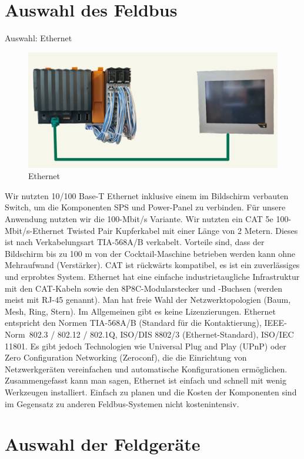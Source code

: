 \documentclass[10pt,a4paper]{report}
\begin{document}
	\section{Auswahl des Feldbus}
	Auswahl: Ethernet\\
	\begin{figure}[htb]
		\includegraphics[width=1\textwidth]{Ethernet}
		\centering
		\caption{Ethernet}
	\end{figure}
	Wir nutzten 10/100 Base-T Ethernet inklusive einem im Bildschirm verbauten Switch, um die Komponenten SPS und Power-Panel zu verbinden. Für unsere Anwendung nutzten wir die 100-Mbit/s Variante. 
	Wir nutzten ein CAT 5e 100-Mbit/s-Ethernet Twisted Pair Kupferkabel mit einer Länge von 2 Metern. Dieses ist nach Verkabelungsart TIA-568A/B verkabelt. 
	Vorteile sind, dass der Bildschirm bis zu 100 m von der Cocktail-Maschine betrieben werden kann ohne Mehraufwand (Verstärker). CAT ist rückwärts kompatibel, es ist ein zuverlässiges und erprobtes System. 
	Ethernet hat eine einfache industrietaugliche Infrastruktur mit den CAT-Kabeln sowie den 8P8C-Modularstecker und -Buchsen (werden meist mit RJ-45 genannt). Man hat freie Wahl der Netzwerktopologien (Baum, Mesh, Ring, Stern).
	Im Allgemeinen gibt es keine Lizenzierungen.
	Ethernet entspricht den Normen TIA-568A/B (Standard für die Kontaktierung), IEEE-Norm 802.3 / 802.12 / 802.1Q, ISO/DIS 8802/3 (Ethernet-Standard), ISO/IEC 11801.
	Es gibt jedoch Technologien wie Universal Plug and Play (UPnP) oder Zero Configuration Networking (Zeroconf), die die Einrichtung von Netzwerkgeräten vereinfachen und automatische Konfigurationen ermöglichen. 
	Zusammengefasst kann man sagen, Ethernet ist einfach und schnell mit wenig Werkzeugen installiert. Einfach zu planen und die Kosten der Komponenten sind im Gegensatz zu anderen Feldbus-Systemen nicht kostenintensiv. \\
	
	\section{Auswahl der Feldgeräte}
	
\end{document}
